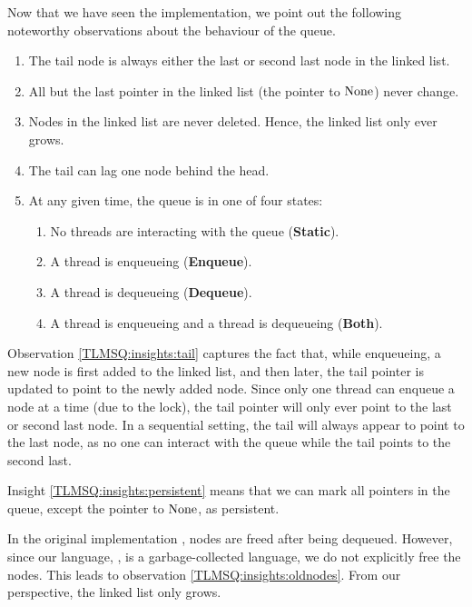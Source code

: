 \documentclass[a4paper, 10pt]{report}
\theoremstyle{definition}
\newcommand{\StaticState}{\textbf{Static}\xspace}
\newcommand{\EnqueueState}{\textbf{Enqueue}\xspace}
\newcommand{\DequeueState}{\textbf{Dequeue}\xspace}
\newcommand{\BothState}{\textbf{Both}\xspace}
\begin{document}
Now that we have seen the implementation, we point out the following noteworthy observations about the behaviour of the queue.
\begin{enumerate}
  \item\label{TLMSQ:insights:tail} The tail node is always either the last or second last node in the linked list.
  \item\label{TLMSQ:insights:persistent} All but the last pointer in the linked list (the pointer to $\operatorname{None}$) never change.
  \item\label{TLMSQ:insights:oldnodes} Nodes in the linked list are never deleted. Hence, the linked list only ever grows.
  \item\label{TLMSQ:insights:lag} The tail can lag one node behind the head.
  \item\label{TLMSQ:insights:states} At any given time, the queue is in one of four states:
    \begin{enumerate}
      \item\label{TLMSQ:insights:state:static} No threads are interacting with the queue (\StaticState).
      \item\label{TLMSQ:insights:state:enqueue} A thread is enqueueing (\EnqueueState).
      \item\label{TLMSQ:insights:state:dequeue} A thread is dequeueing (\DequeueState).
      \item\label{TLMSQ:insights:state:both} A thread is enqueueing and a thread is dequeueing (\BothState).
    \end{enumerate}
\end{enumerate}

Observation \ref{TLMSQ:insights:tail} captures the fact that, while enqueueing, a new node is first added to the linked list, and then later, the tail pointer is updated to point to the newly added node. Since only one thread can enqueue a node at a time (due to the lock), the tail pointer will only ever point to the last or second last node. In a sequential setting, the tail will always appear to point to the last node, as no one can interact with the queue while the tail points to the second last.

Insight \ref{TLMSQ:insights:persistent} means that we can mark all pointers in the queue, except the pointer to $\operatorname{None}$, as persistent.

In the original implementation \citep{DBLP:conf/podc/MichaelS96}, nodes are freed after being dequeued. However, since our language, \heaplang, is a garbage-collected language, we do not explicitly free the nodes. This leads to observation \ref{TLMSQ:insights:oldnodes}. From our perspective, the linked list only grows.
\end{document}
